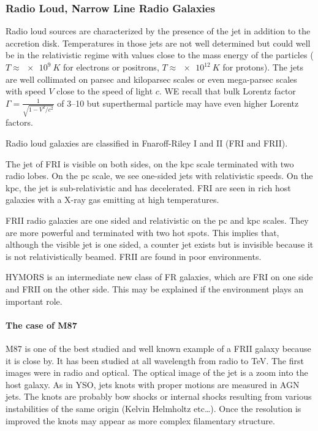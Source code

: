 \documentclass[10pt,a4paper,english]{article}
\begin{document}
\subsubsection{Radio Loud, Narrow Line Radio Galaxies}
Radio loud sources are characterized by the presence of the jet in
addition to the accretion disk. Temperatures in those jets are not
well determined but could well be in the relativistic regime with
values close to the mass energy of the particles
($T \approx \SI{e9}{K}$ for electrons or positrons,
$T\approx \SI{e12}{K}$ for protons). The jets are well collimated on
parsec and kiloparsec scales or even mega-parsec scales with speed $V$
close to the speed of light $c$. WE recall that bulk Lorentz factor
$\Gamma = \frac{1}{\sqrt{1 - V^2/c^2}}$ of \numrange{3}{10} but
superthermal particle may have even higher Lorentz factors.

Radio loud galaxies are classified in Fnaroff-Riley I and II (FRI and
FRII).

The jet of FRI is visible on both sides, on the kpc scale terminated
with two radio lobes. On the pc scale, we see one-sided jets with
relativistic speeds. On the kpc, the jet is sub-relativistic and has
decelerated. FRI are seen in rich host galaxies with a X-ray gas
emitting at high temperatures.

FRII radio galaxies are one sided and relativistic on the pc and kpc scales. They are more powerful and terminated with two hot spots. This implies that, although the visible jet is one sided, a counter jet exists but is invisible because it is not relativistically beamed. FRII are found in poor environments.

HYMORS is an intermediate new class of FR galaxies, which are FRI on one side and FRII on the other side. This may be explained if the environment plays an important role.

\paragraph{The case of M87}
M87 is one of the best studied and well known example of a FRII galaxy because it is close by. It has been studied at all wavelength from radio to \si{TeV}. The first images were in radio and optical. The optical image of the jet is a zoom into the host galaxy. As in YSO, jets knots with proper motions are measured in AGN jets. The knots are probably bow shocks or internal shocks resulting from various instabilities of the same origin (Kelvin Helmholtz etc…). Once the resolution is improved the knots may appear as more complex filamentary structure.
\end{document}

